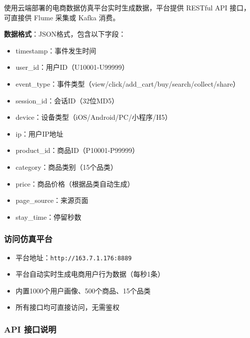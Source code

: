 \documentclass[12pt,a4paper]{article}
\begin{document}
\begin{knowledgebox}[数据来源方案]
使用云端部署的电商数据仿真平台实时生成数据，平台提供 RESTful API 接口，可直接供 Flume 采集或 Kafka 消费。

\textbf{数据格式}：JSON格式，包含以下字段：
\begin{itemize}
    \item timestamp：事件发生时间
    \item user\_id：用户ID（U10001-U99999）
    \item event\_type：事件类型（view/click/add\_cart/buy/search/collect/share）
    \item session\_id：会话ID（32位MD5）
    \item device：设备类型（iOS/Android/PC/小程序/H5）
    \item ip：用户IP地址
    \item product\_id：商品ID（P10001-P99999）
    \item category：商品类别（15个品类）
    \item price：商品价格（根据品类自动生成）
    \item page\_source：来源页面
    \item stay\_time：停留秒数
\end{itemize}
\end{knowledgebox}

\subsubsection{访问仿真平台}

\begin{tipbox}[平台访问]
\begin{itemize}
    \item 平台地址：\texttt{http://163.7.1.176:8889}
    \item 平台自动实时生成电商用户行为数据（每秒1条）
    \item 内置1000个用户画像、500个商品、15个品类
    \item 所有接口均可直接访问，无需鉴权
\end{itemize}
\end{tipbox}

\subsubsection{API 接口说明}
\end{document}

